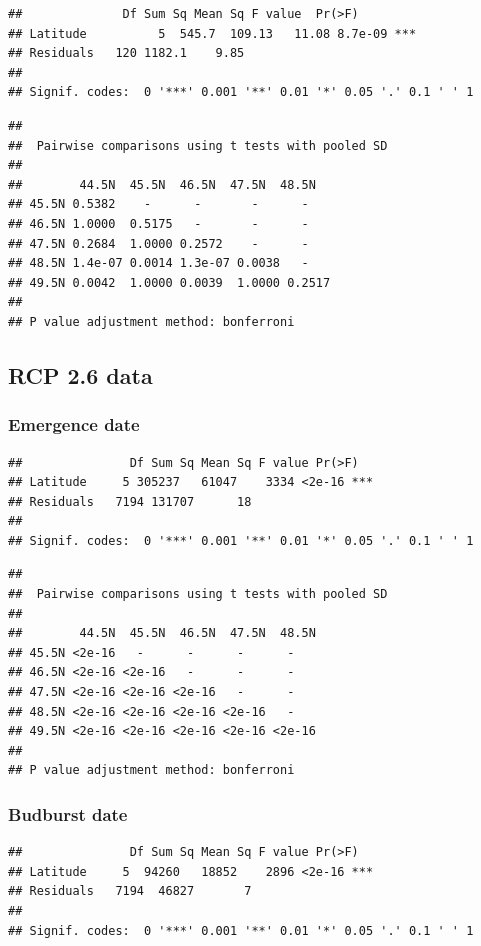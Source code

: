 \documentclass[12 pt]{article}
\begin{document}
\begin{verbatim}
##              Df Sum Sq Mean Sq F value  Pr(>F)    
## Latitude          5  545.7  109.13   11.08 8.7e-09 ***
## Residuals   120 1182.1    9.85                    
## 
## Signif. codes:  0 '***' 0.001 '**' 0.01 '*' 0.05 '.' 0.1 ' ' 1
\end{verbatim}

\begin{verbatim}
## 
##  Pairwise comparisons using t tests with pooled SD 
## 
##        44.5N  45.5N  46.5N  47.5N  48.5N
## 45.5N 0.5382    -      -       -      -     
## 46.5N 1.0000  0.5175   -       -      -     
## 47.5N 0.2684  1.0000 0.2572    -      -     
## 48.5N 1.4e-07 0.0014 1.3e-07 0.0038   -     
## 49.5N 0.0042  1.0000 0.0039  1.0000 0.2517
## 
## P value adjustment method: bonferroni
\end{verbatim}

\subsection{RCP 2.6 data}
\subsubsection*{Emergence date}

\begin{verbatim}
##               Df Sum Sq Mean Sq F value Pr(>F)    
## Latitude     5 305237   61047    3334 <2e-16 ***
## Residuals   7194 131707      18                   
## 
## Signif. codes:  0 '***' 0.001 '**' 0.01 '*' 0.05 '.' 0.1 ' ' 1
\end{verbatim}

\begin{verbatim}
## 
##  Pairwise comparisons using t tests with pooled SD 
##  
##        44.5N  45.5N  46.5N  47.5N  48.5N
## 45.5N <2e-16   -      -      -      -     
## 46.5N <2e-16 <2e-16   -      -      -     
## 47.5N <2e-16 <2e-16 <2e-16   -      -     
## 48.5N <2e-16 <2e-16 <2e-16 <2e-16   -     
## 49.5N <2e-16 <2e-16 <2e-16 <2e-16 <2e-16
## 
## P value adjustment method: bonferroni
\end{verbatim}

\subsubsection*{Budburst date}

\begin{verbatim}
##               Df Sum Sq Mean Sq F value Pr(>F)    
## Latitude     5  94260   18852    2896 <2e-16 ***
## Residuals   7194  46827       7                   
## 
## Signif. codes:  0 '***' 0.001 '**' 0.01 '*' 0.05 '.' 0.1 ' ' 1
\end{verbatim}
\end{document}
